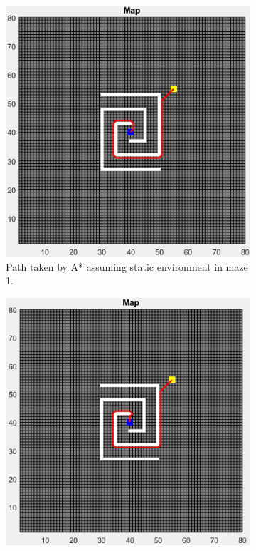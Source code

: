 \begin{figure}
	\centering
    \begin{subfigure}[t]{0.32\columnwidth}
		\centering
		\includegraphics[width=\textwidth]{images/a_star_static_maze_1.png}
		\caption{Path taken by A* assuming static environment in maze 1.}
        \label{fig:a_star_static_path_maze_1}
	\end{subfigure}
    \hfill
	\begin{subfigure}[t]{0.32\columnwidth}
		\centering
		\includegraphics[width=\textwidth]{images/dijkstra_static_maze_1.png}

\end{subfigure}
\end{figure}
